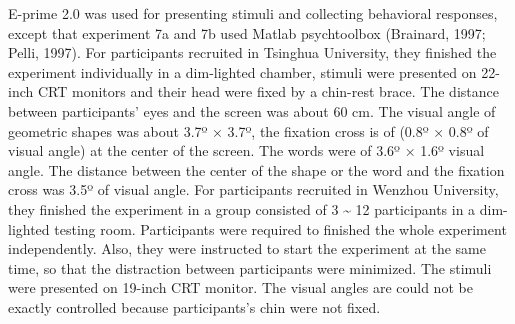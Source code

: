 \documentclass[man]{apa6}
\begin{document}
E-prime 2.0 was used for presenting stimuli and collecting behavioral responses, except that experiment 7a and 7b used Matlab psychtoolbox (Brainard, 1997; Pelli, 1997). For participants recruited in Tsinghua University, they finished the experiment individually in a dim-lighted chamber, stimuli were presented on 22-inch CRT monitors and their head were fixed by a chin-rest brace. The distance between participants' eyes and the screen was about 60 cm. The visual angle of geometric shapes was about 3.7º × 3.7º, the fixation cross is of (0.8º × 0.8º of visual angle) at the center of the screen. The words were of 3.6º × 1.6º visual angle. The distance between the center of the shape or the word and the fixation cross was 3.5º of visual angle. For participants recruited in Wenzhou University, they finished the experiment in a group consisted of 3 \textasciitilde{} 12 participants in a dim-lighted testing room. Participants were required to finished the whole experiment independently. Also, they were instructed to start the experiment at the same time, so that the distraction between participants were minimized. The stimuli were presented on 19-inch CRT monitor. The visual angles are could not be exactly controlled because participants's chin were not fixed.
\end{document}
